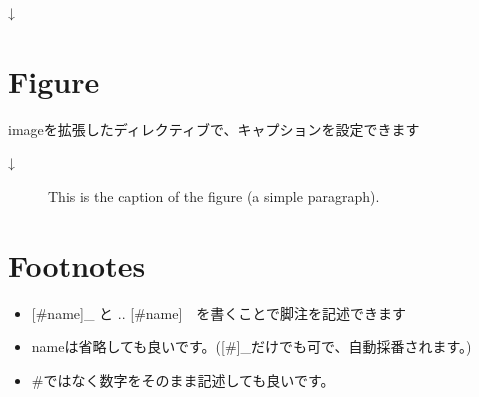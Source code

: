 \documentclass[letterpaper,10pt,dvipdfmx,openany,oneside]{sphinxmanual}
\begin{document}
%
\begin{sphinxVerbatim}[commandchars=\\\{\}]
  
     
    
\end{sphinxVerbatim}

↓



\section{Figure}
\label{\detokenize{1.chapter/basic_syntax:figure}}
imageを拡張したディレクティブで、キャプションを設定できます

%
\begin{sphinxVerbatim}[commandchars=\\\{\}]
 

  
     
       

            
\end{sphinxVerbatim}

↓

\begin{figure}[htbp]
\centering
\capstart

\noindent{}
\caption{This is the caption of the figure (a simple paragraph).}\label{\detokenize{1.chapter/basic_syntax:figure-reference}}\label{\detokenize{1.chapter/basic_syntax:id7}}\end{figure}


\section{Footnotes}
\label{\detokenize{1.chapter/basic_syntax:footnotes}}\begin{itemize}
\item {} 
{[}\#name{]}\_ と  .. {[}\#name{]}　を書くことで脚注を記述できます

\item {} 
nameは省略しても良いです。({[}\#{]}\_だけでも可で、自動採番されます。)

\item {} 
\#ではなく数字をそのまま記述しても良いです。

\end{itemize}
\end{document}
